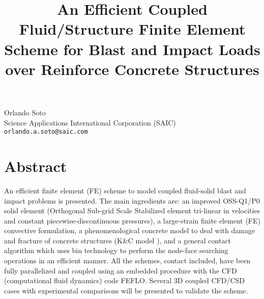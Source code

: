 \title{An Efficient Coupled Fluid/Structure Finite Element Scheme for Blast and Impact Loads over Reinforce Concrete Structures}
 \author{} \institute{}
\maketitle
\begin{center}
{\large Orlando Soto}\\
Science Applications International Corporation (SAIC)\\
{\tt orlando.a.soto@saic.com}

\end{center}

\section*{Abstract}

An efficient finite element (FE) scheme to model coupled fluid-solid
blast and impact problems is presented. The main ingredients are: 
an improved OSS-Q1/P0 solid element (Orthogonal Sub-grid Scale
Stabilized element tri-linear in velocities and constant
piecewise-discontinuous pressures), a large-strain finite element (FE)
convective formulation, a phenomenological concrete model to deal with damage
and fracture of concrete structures (K\&C model \cite{kcpaper}),
and a general contact algorithm which
uses bin technology to perform the node-face searching operations in an
efficient manner. All the schemes, contact included, have been fully
parallelized 
and coupled using an embedded procedure with the CFD
(computational fluid dynamics) code FEFLO. Several 3D coupled CFD/CSD cases
with experimental comparisons will be presented to validate the scheme.

